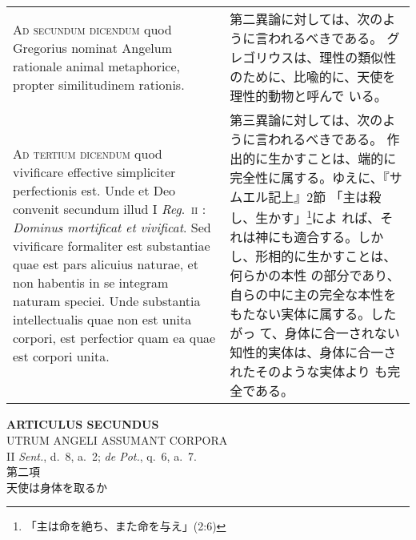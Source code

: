 \documentclass[10pt]{jsarticle} %
\begin{document}
\begin{longtable}{p{21em}p{21em}}
\\


{\scshape Ad secundum dicendum} quod Gregorius nominat
Angelum rationale animal metaphorice, propter similitudinem rationis.


&
第二異論に対しては、次のように言われるべきである。
グレゴリウスは、理性の類似性のために、比喩的に、天使を理性的動物と呼んで
 いる。

\\


{\scshape Ad tertium dicendum} quod vivificare effective simpliciter
perfectionis est. Unde et Deo convenit secundum illud I {\itshape
Reg}.~{\scshape ii} : {\itshape Dominus mortificat et vivificat}. Sed
vivificare formaliter est substantiae quae est pars alicuius naturae, et
non habentis in se integram naturam speciei. Unde substantia
intellectualis quae non est unita corpori, est perfectior quam ea quae
est corpori unita.


&

第三異論に対しては、次のように言われるべきである。
作出的に生かすことは、端的に完全性に属する。ゆえに、『サムエル記上』2節
 「主は殺し、生かす」\footnote{「主は命を絶ち、また命を与え」(2:6)}によ
 れば、それは神にも適合する。しかし、形相的に生かすことは、何らかの本性
 の部分であり、自らの中に主の完全な本性をもたない実体に属する。したがっ
 て、身体に合一されない知性的実体は、身体に合一されたそのような実体より
 も完全である。


\end{longtable}
\newpage

\begin{center}
 {\Large {\bf ARTICULUS SECUNDUS}}\\
 {\large UTRUM ANGELI ASSUMANT CORPORA}\\
 {\footnotesize II {\itshape Sent.}, d.~8, a.~2; {\itshape de Pot.},
 q.~6, a.~7.}\\
 {\Large 第二項\\天使は身体を取るか}
\end{center}
\end{document}
